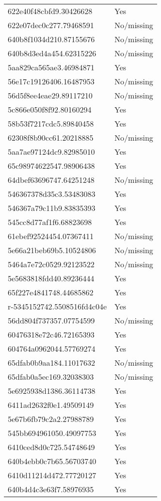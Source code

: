 \begin{tabular}{ll}
622e40f48cbfd9.30426628 & Yes \\
622e07dec0c277.79468591 & No/missing \\
640b8f1034d210.87155676 & No/missing \\
640b8d3ed4a454.62315226 & No/missing \\
5aa829ca565ae3.46984871 & Yes \\
56e17c19126406.16487953 & No/missing \\
56d5f8ee4eae29.89117210 & No/missing \\
5c866e050f8f92.80160294 & Yes \\
58b53f7217cdc5.89840458 & Yes \\
62308f8b90cc61.20218885 & No/missing \\
5aa7ae97124dc9.82985010 & Yes \\
65c98974622547.98906438 & Yes \\
64dbef63696747.64251248 & No/missing \\
546367378d35c3.53483083 & Yes \\
546367a79c11b9.83835393 & Yes \\
545cc8d77af1f6.68823698 & Yes \\
61ebef92524454.07367411 & No/missing \\
5e66a21beb69b5.10524806 & No/missing \\
5464a7e72c0529.92123522 & No/missing \\
5e5683818fdd40.89236444 & Yes \\
65f227e4841748.44685862 & Yes \\
r-5345152742.5508516fd4c04e & Yes \\
56dd804f737357.07754599 & No/missing \\
60476318e72c46.72165393 & Yes \\
604764a0962044.57769274 & Yes \\
65dfab0b9aa184.11017632 & No/missing \\
65dfab0a5ec169.32038303 & No/missing \\
5e6925938d1386.36114738 & Yes \\
6411ad2632f0e1.49509149 & Yes \\
5e67b6fb79c2a2.27988789 & Yes \\
545bb694961050.49097753 & Yes \\
6410ced8d0c725.54748649 & Yes \\
640b4ebb0c7b65.56703740 & Yes \\
6410d11214d472.77720127 & Yes \\
640b4d4c3e63f7.58976935 & Yes \\

\end{tabular}
